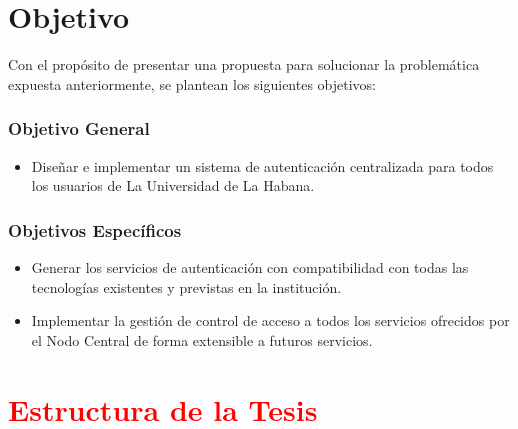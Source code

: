 \section*{Objetivo}
Con el propósito de presentar una propuesta para solucionar la problemática expuesta anteriormente, se plantean los siguientes objetivos:

\subsubsection*{Objetivo General}

\begin{itemize}	
	\item Diseñar e implementar un sistema de autenticación centralizada para todos los usuarios de La Universidad de La Habana. 
\end{itemize}

\subsubsection*{Objetivos Específicos}
\begin{itemize}	
	\item Generar los servicios de autenticación con compatibilidad con todas las tecnologías existentes y previstas en la institución.
	\item Implementar la gestión de control de acceso a todos los servicios ofrecidos por el Nodo Central de forma extensible a futuros servicios.
\end{itemize}

\section*{\textcolor{red}{Estructura de la Tesis}}